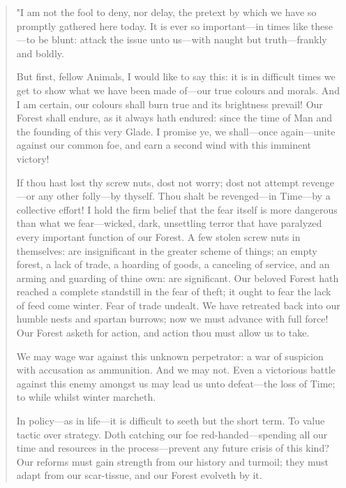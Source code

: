 \begingroup
\fontsize{10pt}{12pt}\selectfont
	\begin{quote}
		"I am not the fool to deny, nor delay, the pretext by which we have so promptly gathered here today. It is ever so important---in times like these---to be blunt: attack the issue unto us---with naught but truth---frankly and boldly. 
		
		
		But first, fellow Animals, I would like to say this: it is in difficult times we get to show what we have been made of---our true colours and morals. And I am certain, our colours shall burn true and its brightness prevail! Our Forest shall endure, as it always hath endured: since the time of Man and the founding of this very Glade. I promise ye, we shall---once again---unite against our common foe, and earn a second wind with this imminent victory!
		
		If thou hast lost thy screw nuts, dost not worry; dost not attempt revenge---or any other folly---by thyself. Thou shalt be revenged---in Time---by a collective effort!
		I hold the firm belief that the fear itself is more dangerous than what we fear---wicked, dark, unsettling terror that have paralyzed every important function of our Forest. A few stolen screw nuts in themselves: are insignificant in the greater scheme of things; an empty forest, a lack of trade, a hoarding of goods, a canceling of service, and an arming and guarding of thine own: are significant. Our beloved Forest hath reached a complete standstill in the fear of theft; it ought to fear the lack of feed come winter. Fear of trade undealt. We have retreated back into our humble nests and spartan burrows; now we must advance with full force! Our Forest asketh for action, and action thou must allow us to take.
		
		We may wage war against this unknown perpetrator: a war of suspicion with accusation as ammunition. And we may not. Even a victorious battle against this enemy amongst us may lead us unto defeat---the loss of Time; to while whilst winter marcheth.
		
		In policy---as in life---it is difficult to seeth but the short term. To value tactic over strategy. Doth catching our foe red-handed---spending all our time and resources in the process---prevent any future crisis of this kind? Our reforms must gain strength from our history and turmoil; they must adapt from our scar-tissue, and our Forest evolveth by it.
		

\end{quote}
